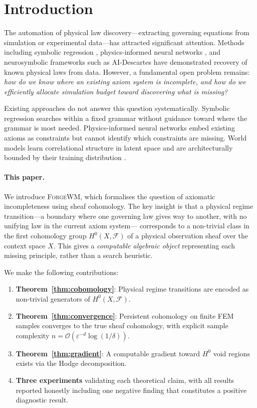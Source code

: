 \documentclass[twoside,11pt]{article}
\newcommand{\FA}{\mathcal{F}}
\newcommand{\ForgeWM}{\textsc{ForgeWM}\xspace}
\begin{document}
\section{Introduction}
\label{sec:intro}

The automation of physical law discovery---extracting governing
equations from simulation or experimental data---has attracted
significant attention. Methods including symbolic regression
\citep{schmidt2009distilling}, physics-informed neural networks
\citep{raissi2019physics}, and neurosymbolic frameworks such as
AI-Descartes \citep{cornelio2023combining} have demonstrated recovery
of known physical laws from data. However, a fundamental open problem
remains: \emph{how do we know where an existing axiom system is
incomplete, and how do we efficiently allocate simulation budget toward
discovering what is missing?}

Existing approaches do not answer this question systematically.
Symbolic regression searches within a fixed grammar without guidance
toward where the grammar is most needed. Physics-informed neural
networks embed existing axioms as constraints but cannot identify which
constraints are missing. World models learn correlational structure in
latent space and are architecturally bounded by their training
distribution \citep{lecun2022path,consensus2025survey}.

\paragraph{This paper.}
We introduce \ForgeWM, which formalises the question of axiomatic
incompleteness using sheaf cohomology. The key insight is that a
physical regime transition---a boundary where one governing law gives
way to another, with no unifying law in the current axiom system---
corresponds to a non-trivial class in the first cohomology group
$H^0(X, \FA)$ of a physical observation sheaf over the context space
$X$. This gives a \emph{computable algebraic object} representing each
missing principle, rather than a search heuristic.

We make the following contributions:

\begin{enumerate}[label=(\roman*)]
\item \textbf{Theorem~\ref{thm:cohomology}}: Physical regime
  transitions are encoded as non-trivial generators of $H^0(X,\FA)$.
\item \textbf{Theorem~\ref{thm:convergence}}: Persistent cohomology on
  finite FEM samples converges to the true sheaf cohomology, with
  explicit sample complexity $n = \mathcal{O}(\varepsilon^{-d}
  \log(1/\delta))$.
\item \textbf{Theorem~\ref{thm:gradient}}: A computable gradient
  toward $H^0$ void regions exists via the Hodge decomposition.
\item \textbf{Three experiments} validating each theoretical claim,
  with all results reported honestly including one negative finding that
  constitutes a positive diagnostic result.
\end{enumerate}
\end{document}
